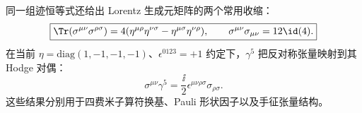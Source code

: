 同一组迹恒等式还给出 Lorentz 生成元矩阵的两个常用收缩：
\begin{equation}
 \boxed{\Tr(\sigma^{\mu\nu}\sigma^{\rho\sigma})
 =4(\eta^{\mu\rho}\eta^{\nu\sigma}-\eta^{\mu\sigma}\eta^{\nu\rho}),
 \qquad
 \sigma^{\mu\nu}\sigma_{\mu\nu}=12\id(4).}
 \label{eq:sigma-sigma-trace-r68}
\end{equation}
在当前 $\eta=\mathrm{diag}(1,-1,-1,-1)$、$\epsilon^{0123}=+1$ 约定下，$\gamma^5$ 把反对称张量映射到其 Hodge 对偶：
\begin{equation}
 \boxed{\sigma^{\mu\nu}\gamma^5
 =\frac{\ii}{2}\epsilon^{\mu\nu\rho\sigma}\sigma_{\rho\sigma}.}
 \label{eq:sigma-gamma5-dual-r68}
\end{equation}
这些结果分别用于四费米子算符换基、Pauli 形状因子以及手征张量结构。

